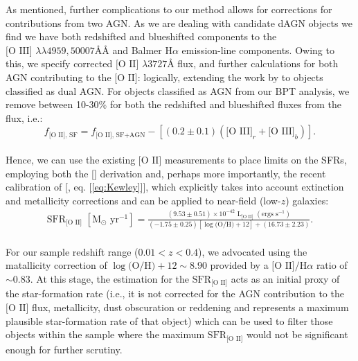 As mentioned, further complications to our method allows for corrections for contributions from two AGN. As we are dealing with candidate dAGN objects we find we have both redshifted and blueshifted components to the $\text{[O III] }\lambda\lambda4959,50007ÅÅ$ and Balmer $\text{H}\alpha$ emission-line components. Owing to this, we specify corrected $\text{[O II] }\lambda3727Å$ flux, and further calculations for both AGN contributing to the $\text{[O II]}$: logically, extending the work by \cite{2006ApJ...642..702K} to objects classified as dual AGN. For objects classified as AGN from our BPT analysis, we remove between 10-30\% for both the redshifted and blueshifted \text{[O III]} fluxes from the \text{[O II]} flux, i.e.:
\\
\begin{equation}
\label{eq:KimCorrection}
f_{\text{[O II], SF}}=f_{\text{[O II], SF+AGN}}-\left[(0.2\pm{0.1})(\text{[O III]}_r+\text{[O III]}_b)\right].
\end{equation}
\\

Hence, we can use the existing $\text{[O II]}$ measurements to place limits on the SFRs, employing both the [\cite{Kennicutt_1998}] derivation and, perhaps more importantly, the recent calibration of [\cite{Kewley_2004}, eq. [\ref{eq:Kewley}]], which explicitly takes into account extinction and metallicity corrections and can be applied to near-field (low-$z$) galaxies:
\\
\begin{equation}
\begin{align}
\label{eq:Kewley}
{\text{SFR}}_{\text{[O II]}}\,\,[\text{M}_\odot \text{ yr}^{-1}]=\frac{(9.53\pm{0.51})\times10^{-42}\,\,\text{L}_{\text{[O II]}}\,\,(\text{ergs }\text{s}^{-1})}{(-1.75\pm{0.25})[\log{\text{(O/H)}}+12]+(16.73\pm{2.23})}.
\end{align}
\end{equation}
\\
For our sample redshift range (${{0.01}<{z}<{0.4}}$), we advocated using the \cite{Teplitz_2003} matallicity correction of $\log{\text{(O/H)} +12}\sim{8.90}$ provided by a $\text{[O II]/H}\alpha$ ratio of $\sim{0.83}$. At this stage, the \cite{Kennicutt_1998} estimation for the $\text{SFR}_{\text{[O II]}}$ acts as an initial proxy of the star-formation rate (i.e., it is not corrected for the AGN contribution to the $\text{[O II]}$ flux, metallicity, dust obscuration or reddening and represents a maximum plausible star-formation rate of that object) which can be used to filter those objects within the sample where the maximum $\text{SFR}_{\text{[O II]}}$ would not be significant enough for further scrutiny.

